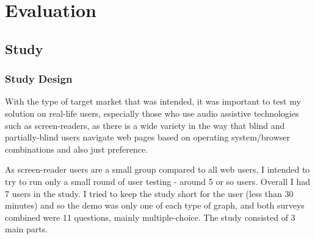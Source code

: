\documentclass[ %
                    author={Aleena Baig},
                supervisor={Dr Simon Lock},
                    degree={BSc},
                     title={On Making Web Accessible Graphs},
                  subtitle={},
                      year={2019} ]{dissertation}
\begin{document}
\chapter{Evaluation}

\section{Study}

\subsection{Study Design}



With the type of target market that was intended, it was important to test my solution on real-life users, especially those who use audio assistive technologies such as screen-readers, as there is a wide variety in the way that blind and partially-blind users navigate web pages based on operating system/browser combinations and also just preference.

As screen-reader users are a small group compared to all web users, I intended to try to run only a small round of user testing - around 5 or so users. Overall I had 7 users in the study. I tried to keep the study short for the user (less than 30 minutes) and so the demo was only one of each type of graph, and both surveys combined were 11 questions, mainly multiple-choice. The study consisted of 3 main parts. 
\end{document}
